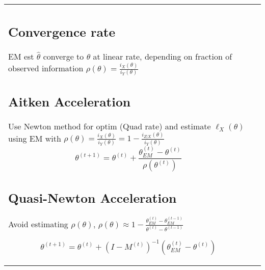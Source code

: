 \begin{tabulary}{\textwidth}{l L}

\subsection{Convergence rate}

EM est $\hat\theta$ converge to $\theta$ at linear rate, depending on fraction of observed information $\rho(\theta)=\frac{i_X(\theta)}{i_Y(\theta)}$

\subsection{Aitken Acceleration}

Use Newton method for optim (Quad rate) and estimate $\ell_X(\theta)$ using EM with
$\rho(\theta)=\frac{i_X(\theta)}{i_Y(\theta)} = 1 - \frac{i_{Z|X}(\theta)}{i_Y(\theta)}$
$$\theta^{(t+1)}=\theta^{(t)}+\frac{\theta_{EM}^{(t)} - \theta^{(t)}}{\rho(\theta^{(t)})}$$

\subsection{Quasi-Newton Acceleration}

Avoid estimating $\rho(\theta)$,
$
\rho(\theta) \approx 1 - \frac{\theta^{(t)}_{EM} - \theta^{(t-1)}_{EM}}{\theta^{(t)} - \theta^{(t-1)}}
$

$$
\theta^{(t+1)} = \theta^{(t)} + (I - M^{(t)})^{-1} (\theta_{EM}^{(t)} - \theta^{(t)})
$$

\end{tabulary}